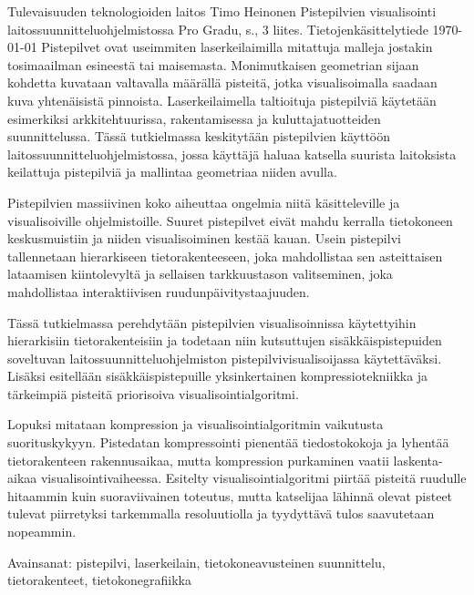 \newpage
\begin{tiivistelma}%
        {Tulevaisuuden teknologioiden laitos}%
        {Timo Heinonen}%
        {Pistepilvien visualisointi laitossuunnitteluohjelmistossa}
        {Pro Gradu, \pageref{LastPage} s., 3 liites.}%
        {Tietojenkäsittelytiede}%
        {\today}%
  Pistepilvet ovat useimmiten laserkeilaimilla mitattuja malleja jostakin tosimaailman esineestä tai maisemasta. Monimutkaisen geometrian sijaan kohdetta kuvataan valtavalla määrällä pisteitä, jotka visualisoimalla saadaan kuva yhtenäisistä pinnoista. Laserkeilaimella taltioituja pistepilviä käytetään esimerkiksi arkkitehtuurissa, rakentamisessa ja kuluttajatuotteiden suunnittelussa. Tässä tutkielmassa keskitytään pistepilvien käyttöön laitossuunnitteluohjelmistossa, jossa käyttäjä haluaa katsella suurista laitoksista keilattuja pistepilviä ja mallintaa geometriaa niiden avulla.

  Pistepilvien massiivinen koko aiheuttaa ongelmia niitä käsitteleville ja visualisoiville ohjelmistoille. Suuret pistepilvet eivät mahdu kerralla tietokoneen keskusmuistiin ja niiden visualisoiminen kestää kauan. Usein pistepilvi tallennetaan hierarkiseen tietorakenteeseen, joka mahdollistaa sen asteittaisen lataamisen kiintolevyltä ja sellaisen tarkkuustason valitseminen, joka mahdollistaa interaktiivisen ruudunpäivitystaajuuden.
  
  Tässä tutkielmassa perehdytään pistepilvien visualisoinnissa käytettyihin hierarkisiin tietorakenteisiin ja todetaan niin kutsuttujen sisäkkäispistepuiden soveltuvan laitossuunnitteluohjelmiston pistepilvivisualisoijassa käytettäväksi. Lisäksi esitellään sisäkkäispistepuille yksinkertainen kompressiotekniikka ja tärkeimpiä pisteitä priorisoiva visualisointialgoritmi. 
  
  Lopuksi mitataan kompression ja visualisointialgoritmin vaikutusta suorituskykyyn. Pistedatan kompressointi pienentää tiedostokokoja ja lyhentää tietorakenteen rakennusaikaa, mutta kompression purkaminen vaatii laskenta-aikaa visualisointivaiheessa. Esitelty visualisointialgoritmi piirtää pisteitä ruudulle hitaammin kuin suoraviivainen toteutus, mutta katselijaa lähinnä olevat pisteet tulevat piirretyksi tarkemmalla resoluutiolla ja tyydyttävä tulos saavutetaan nopeammin.

  Avainsanat: pistepilvi, laserkeilain, tietokoneavusteinen suunnittelu, tietorakenteet, tietokonegrafiikka

\end{tiivistelma}

